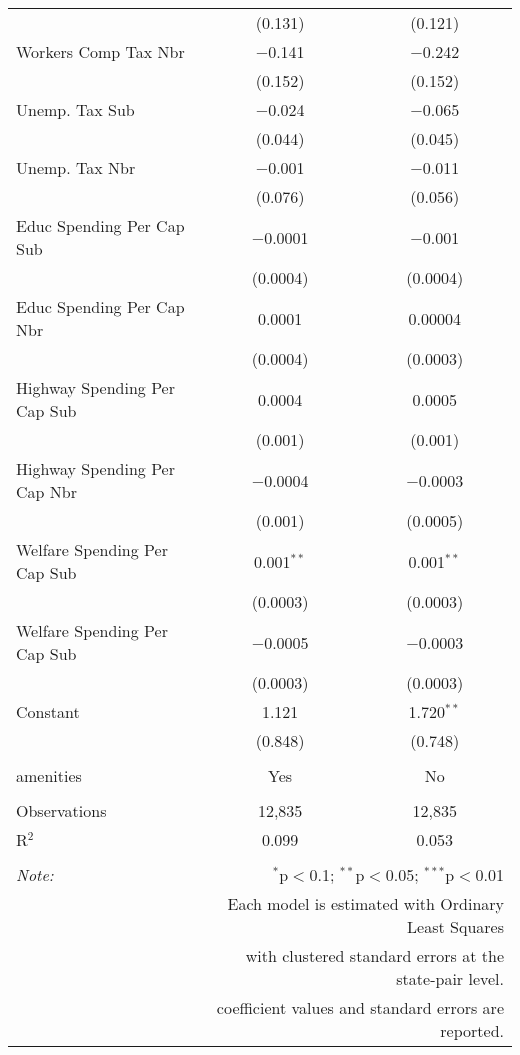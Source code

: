 \begin{table}[!htbp]
\begin{tabular}{@{\extracolsep{5pt}}lcc}
  & (0.131) & (0.121) \\ 
  Workers Comp Tax Nbr & $-$0.141 & $-$0.242 \\ 
  & (0.152) & (0.152) \\ 
  Unemp. Tax Sub & $-$0.024 & $-$0.065 \\ 
  & (0.044) & (0.045) \\ 
  Unemp. Tax Nbr & $-$0.001 & $-$0.011 \\ 
  & (0.076) & (0.056) \\ 
  Educ Spending Per Cap Sub & $-$0.0001 & $-$0.001 \\ 
  & (0.0004) & (0.0004) \\ 
  Educ Spending Per Cap Nbr & 0.0001 & 0.00004 \\ 
  & (0.0004) & (0.0003) \\ 
  Highway Spending Per Cap Sub & 0.0004 & 0.0005 \\ 
  & (0.001) & (0.001) \\ 
  Highway Spending Per Cap Nbr & $-$0.0004 & $-$0.0003 \\ 
  & (0.001) & (0.0005) \\ 
  Welfare Spending Per Cap Sub & 0.001$^{**}$ & 0.001$^{**}$ \\ 
  & (0.0003) & (0.0003) \\ 
  Welfare Spending Per Cap Sub & $-$0.0005 & $-$0.0003 \\ 
  & (0.0003) & (0.0003) \\ 
  Constant & 1.121 & 1.720$^{**}$ \\ 
  & (0.848) & (0.748) \\ 
 \hline \\[-1.8ex] 
amenities & Yes & No \\ 
\hline \\[-1.8ex] 
Observations & 12,835 & 12,835 \\ 
R$^{2}$ & 0.099 & 0.053 \\ 
\hline 
\hline \\[-1.8ex] 
\textit{Note:}  & \multicolumn{2}{r}{$^{*}$p$<$0.1; $^{**}$p$<$0.05; $^{***}$p$<$0.01} \\ 
 & \multicolumn{2}{r}{Each model is estimated with Ordinary Least Squares} \\ 
 & \multicolumn{2}{r}{with clustered standard errors at the state-pair level.} \\ 
 & \multicolumn{2}{r}{coefficient values and standard errors are reported.} \\ 
\end{tabular} 
\end{table} 
